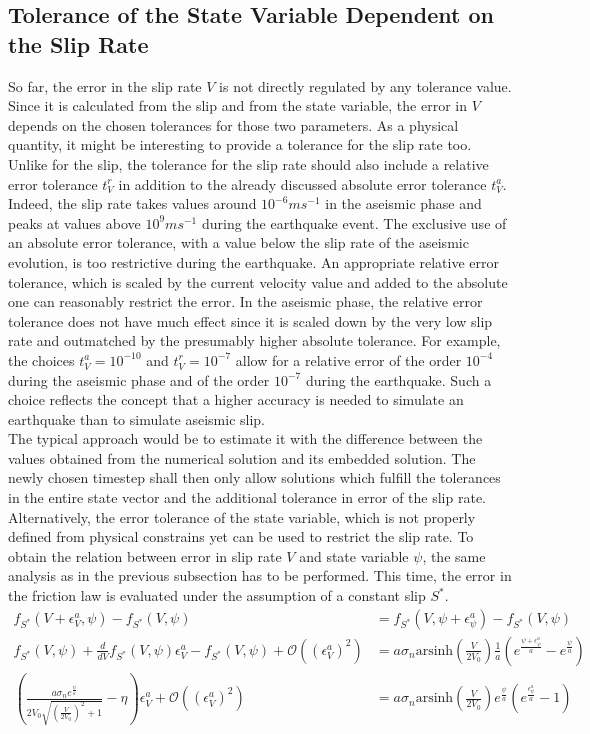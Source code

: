 \subsection{Tolerance of the State Variable Dependent on the Slip Rate}
So far, the error in the slip rate $V$ is not directly regulated by any tolerance value. Since it is calculated from the slip and from the state variable, the error in $V$ depends on the chosen tolerances for those two parameters. As a physical quantity, it might be interesting to provide a tolerance for the slip rate too. Unlike for the slip, the tolerance for the slip rate should also include a relative error tolerance $t_V^r$ in addition to the already discussed absolute error tolerance $t_V^a$. Indeed, the slip rate takes values around $10^{-6}ms^{-1}$ in the aseismic phase and peaks at values above $10^{9}ms^{-1}$ during the earthquake event. The exclusive use of an absolute error tolerance, with a value below the slip rate of the aseismic evolution, is too restrictive during the earthquake. An appropriate relative error tolerance, which is scaled by the current velocity value and added to the absolute one can reasonably restrict the error. In the aseismic phase, the relative error tolerance does not have much effect since it is scaled down by the very low slip rate and outmatched by the presumably higher absolute tolerance. For example, the choices $t_V^a=10^{-10}$ and $t_V^r=10^{-7}$ allow for a relative error of the order $10^{-4}$ during the aseismic phase and of the order $10^{-7}$ during the earthquake. Such a choice reflects the concept that a higher accuracy is needed to simulate an earthquake than to simulate aseismic slip. \\
The typical approach would be to estimate it with the difference between the values obtained from the numerical solution and its embedded solution. The newly chosen timestep shall then only allow solutions which fulfill the tolerances in the entire state vector and the additional tolerance in error of the slip rate. Alternatively, the error tolerance of the state variable, which is not properly defined from physical constrains yet can be used to restrict the slip rate. To obtain the relation between error in slip rate $V$ and state variable $\psi$, the same analysis as in the previous subsection has to be performed. This time, the error in the friction law is evaluated under the assumption of a constant slip $S^*$.  
\begin{align}
	f_{S^*}(V+\epsilon_V^a,\psi) - f_{S^*}(V,\psi) &= f_{S^*}(V,\psi+\epsilon_\psi^a) - f_{S^*}(V,\psi) \\
	 f_{S^*}(V,\psi) + \frac{d}{dV}f_{S^*}(V,\psi)\epsilon_V^a - f_{S^*}(V,\psi) + \mathcal{O}\left(\left(\epsilon_V^a\right)^2\right)&= a \sigma_n \text{arsinh}\left(\frac{V}{2V_0}\right)\frac{1}{a}\left(e^{\frac{\psi+\epsilon_\psi^a}{a}} - e^{\frac{\psi}{a}}\right) \\
	 \left( \frac{a\sigma_ne^{\frac{\psi}{a}}} {2V_0\sqrt{\left(\frac{V}{2V_0}\right)^2+1}}- \eta \right)\epsilon_V^a + \mathcal{O}\left(\left(\epsilon_V^a\right)^2\right) &= a \sigma_n \text{arsinh}\left(\frac{V}{2V_0}\right) e^{\frac{\psi}{a}}\left(e^{\frac{\epsilon_\psi^a}{a}} - 1\right)
\end{align}
